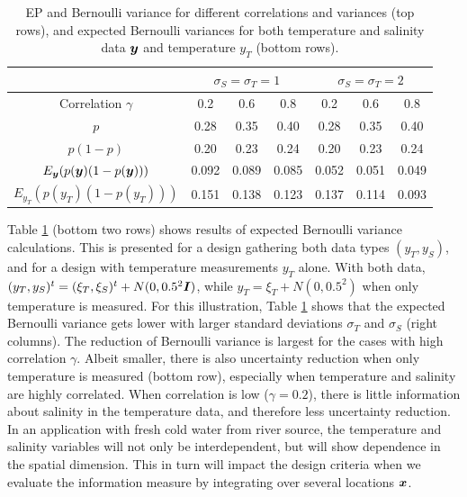 \documentclass[aoas]{imsart}
\begin{document}
\begin{table}[!h] \centering \caption{EP and Bernoulli variance for
    different correlations and variances (top rows), and expected
    Bernoulli variances for both temperature and salinity data ${\boldsymbol y}$ and 
    temperature $y_T$ (bottom rows).}
  \begin{tabular}{c|ccc|ccc}
 &\multicolumn{3}{c}{$\sigma_S=\sigma_T=1$} & \multicolumn{3}{c}{$\sigma_S=\sigma_T=2$} \\
\hline
Correlation $\gamma$ & 0.2 & 0.6 & 0.8 & 0.2 & 0.6 & 0.8 \\
\hline
$p$ & 0.28 & 0.35 & 0.40 & 0.28 & 0.35 & 0.40 \\ 
$p(1-p)$ & 0.20 & 0.23 & 0.24 & 0.20 & 0.23 & 0.24 \\ 
$E_{{\boldsymbol y}}(p({\boldsymbol y}) (1-p({\boldsymbol y})))$ & 0.092 & 0.089 & 0.085 & 0.052 & 0.051 & 0.049 \\ 
$E_{y_T}(p(y_T) (1-p(y_T)))$ & 0.151 & 0.138 & 0.123 & 0.137 & 0.114 & 0.093 \\ 
\hline
\end{tabular}
\label{tab:sim_rhoab}
\end{table}

Table \ref{tab:sim_rhoab} (bottom two rows) shows results of expected
Bernoulli variance calculations. This is presented for a design
gathering both data types $(y_T,y_S)$, and for a design with
temperature measurements $y_T$ alone. With both data,
$(y_T,y_S)^t=(\xi_T,\xi_S)^t+N(0,0.5^2{\boldsymbol I})$, while
$y_T=\xi_T+N(0,0.5^2)$ when only temperature is measured.  For this illustration, Table \ref{tab:sim_rhoab} shows that the expected Bernoulli variance
gets lower with larger standard deviations $\sigma_T$ and $\sigma_S$
(right columns). The reduction of Bernoulli variance is largest
for the cases with high correlation $\gamma$. Albeit smaller, there is
also uncertainty reduction when only temperature is measured (bottom
row), especially when temperature and salinity are highly correlated. When correlation is low ($\gamma=0.2$), there is little
information about salinity in the temperature data, and therefore less
uncertainty reduction. In an application with fresh cold water from
river source, the temperature and salinity variables will not only be
interdependent, but will show dependence in the spatial
dimension. This in turn will impact the design criteria when we
evaluate the information measure by integrating over several locations
${\boldsymbol x}$.

\end{document}
